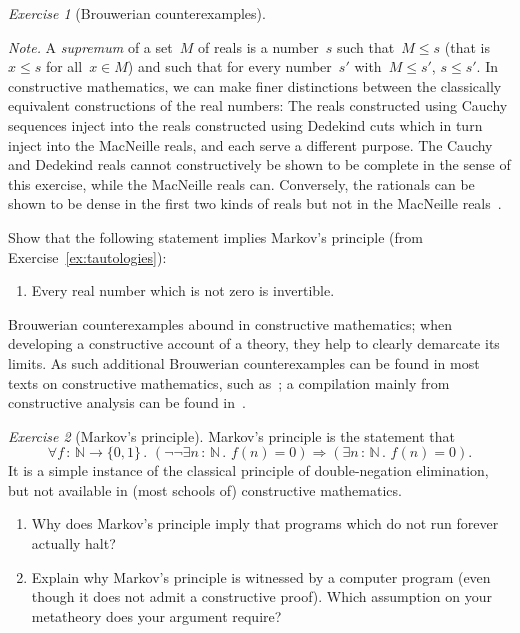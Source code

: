 \documentclass[10pt,reqno,a4paper,openany]{amsbook}
\theoremstyle{definition}
\theoremstyle{plain}
\theoremstyle{remark}
\newcommand{\NN}{\mathbb{N}}
\newcommand{\?}{\,{:}\,}
\renewcommand{\_}{\mathpunct{.}\,}
\newtheorem{exercise}{Exercise}[chapter]
\begin{document}
\begin{exercise}[Brouwerian counterexamples]
\begin{enumerate}
{\noindent\scriptsize\emph{Note.} A \emph{supremum} of a set~$M$ of reals is a
number~$s$ such that~$M \leq s$ (that is~$x \leq s$ for all~$x \in M$) and such
that for every number~$s'$ with~$M \leq s'$, $s \leq s'$. In constructive
mathematics, we can make finer distinctions between the classically equivalent
constructions of the real numbers: The reals constructed using Cauchy
sequences inject into the reals constructed using Dedekind cuts which in turn
inject into the MacNeille reals, and each serve a different purpose. The Cauchy
and Dedekind reals cannot constructively be shown to be complete in the sense
of this exercise, while the MacNeille reals can. Conversely, the rationals can
be shown to be dense in the first two kinds of reals but not in the MacNeille
reals~\cite[Section~D4.7]{johnstone:elephant}.\par}
\end{enumerate}
Show that the following statement implies Markov's principle (from
Exercise~\ref{ex:tautologies}):
\begin{enumerate}
\addtocounter{enumi}{4}
\item Every real number which is not zero is invertible.
\end{enumerate}
\noindent
Brouwerian counterexamples abound in constructive mathematics; when developing
a constructive account of a theory, they help to clearly demarcate its limits.
As such additional Brouwerian counterexamples can be found in most texts on
constructive mathematics, such
as~\cite{mines-richman-ruitenburg:constructive-algebra}; a compilation mainly
from constructive analysis can be found
in~\cite{mandelkern:brouwerian-counterexamples}.
\end{exercise}

\begin{exercise}[Markov's principle]\label{ex:markov}
Markov's principle is the statement that
\[ \forall f \? \NN \to \{0,1\}\_ (\neg\neg\exists n \? \NN\_ f(n) = 0)
\Rightarrow (\exists n \? \NN\_ f(n) = 0). \]
It is a simple instance of the classical principle of double-negation
elimination, but not available in (most schools of) constructive mathematics.
\begin{enumerate}
\item Why does Markov's principle imply that programs which do not run forever
actually halt?
\item Explain why Markov's principle is witnessed by a computer program (even
though it does not admit a constructive proof). Which assumption on your
metatheory does your argument require?
\end{enumerate}
\end{exercise}
\end{document}
